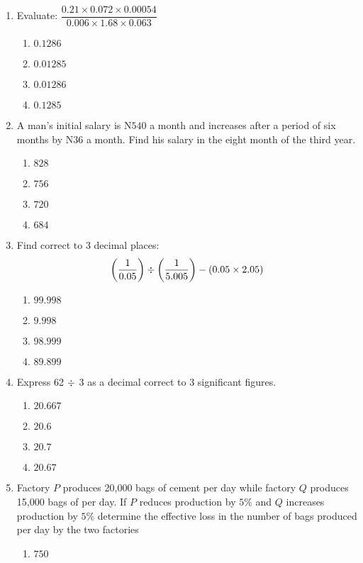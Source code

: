 \begin{multicols}{2}
\begin{enumerate}[label={\arabic*.}]
\item Evaluate: \(\dfrac{0.21 \times 0.072 \times 0.00054}{0.006 \times 1.68 \times 0.063}\)
    \begin{enumerate}[label={\Alph*.}]
    \item \(0.1286\)
    \item \(0.01285\)
    \item \(0.01286\)
    \item \(0.1285\)
    \end{enumerate}
\item A man's initial salary is N\(540\) a month and increases after a period of six months by N\(36\) a
month. Find his salary in the eight month of the third year. 
    \begin{enumerate}[label={\Alph*.}]
    \item \(828\)
    \item \(756\)
    \item \(720\)
    \item \(684\)
    \end{enumerate}
\item Find correct to 3 decimal places: \[\left(\dfrac{1}{0.05}\right)\divisionsymbol \left(\dfrac{1}{5.005}\right) -(0.05 \times 2.05)\]
    \begin{enumerate}[label={\Alph*.}]
    \item \(99.998\)
    \item \(9.998\)
    \item \(98.999\)
    \item \(89.899\)
    \end{enumerate}
\item Express 62 $ \divisionsymbol$ 3 as a decimal correct to 3 significant figures.
    \begin{enumerate}[label={\Alph*.}]
    \item \(20.667\)
    \item \(20.6\)
    \item \(20.7\)
    \item \(20.67\)
    \end{enumerate}
\item Factory $P$ produces 20,000 bags of cement per day while factory $Q$ produces 15,000 bags of per day. If $P$ reduces production by $5\%$ and $Q$ increases production by $5\%$ determine the effective loss in the number of bags produced per day by the two factories 
    \begin{enumerate}[label={\Alph*.}]
    \item \(750\)

\end{enumerate}
\end{enumerate}
\end{multicols}
